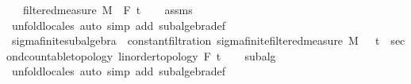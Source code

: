 \begin{isabellebody}
\ \ \ {\isachardoublequoteopen}filtered{\isacharunderscore}{\kern0pt}measure\ M\ {\isacharparenleft}{\kern0pt}{\isasymlambda}{\isacharunderscore}{\kern0pt}{\isachardot}{\kern0pt}\ F{\isacharparenright}{\kern0pt}\ t\isanewline
%
\isadelimproof
\ \ %
\endisadelimproof
%
\isatagproof
{}\isamarkupfalse%
\ assms\ \isamarkupfalse%
\ {\isacharparenleft}{\kern0pt}unfold{\isacharunderscore}{\kern0pt}locales{\isacharparenright}{\kern0pt}\ {\isacharparenleft}{\kern0pt}auto\ simp\ add{\isacharcolon}{\kern0pt}\ subalgebra{\isacharunderscore}{\kern0pt}def{\isacharparenright}{\kern0pt}%
\endisatagproof
{\isafoldproof}%
%
\isadelimproof
\isanewline
%
\endisadelimproof
\isanewline
{}\isamarkupfalse%
\ sigma{\isacharunderscore}{\kern0pt}finite{\isacharunderscore}{\kern0pt}subalgebra\ {\isasymsubseteq}\ constant{\isacharunderscore}{\kern0pt}filtration{\isacharcolon}{\kern0pt}\ sigma{\isacharunderscore}{\kern0pt}finite{\isacharunderscore}{\kern0pt}filtered{\isacharunderscore}{\kern0pt}measure\ M\ {\isachardoublequoteopen}{\isasymlambda}{\isacharunderscore}{\kern0pt}\ {\isacharcolon}{\kern0pt}{\isacharcolon}{\kern0pt}\ {\isacharprime}{\kern0pt}t\ {\isacharcolon}{\kern0pt}{\isacharcolon}{\kern0pt}\ {\isacharbraceleft}{\kern0pt}second{\isacharunderscore}{\kern0pt}countable{\isacharunderscore}{\kern0pt}topology{\isacharcomma}{\kern0pt}\ linorder{\isacharunderscore}{\kern0pt}topology{\isacharbraceright}{\kern0pt}{\isachardot}{\kern0pt}\ F{\isachardoublequoteclose}\ t\isanewline
%
\isadelimproof
\ \ %
\endisadelimproof
%
\isatagproof
{}\isamarkupfalse%
\ subalg\ \isamarkupfalse%
\ {\isacharparenleft}{\kern0pt}unfold{\isacharunderscore}{\kern0pt}locales{\isacharparenright}{\kern0pt}\ {\isacharparenleft}{\kern0pt}auto\ simp\ add{\isacharcolon}{\kern0pt}\ subalgebra{\isacharunderscore}{\kern0pt}def{\isacharparenright}{\kern0pt}%
\endisatagproof
{\isafoldproof}%
%
\isadelimproof
\isanewline
%
\endisadelimproof
%
\isadelimtheory
\isanewline
%
\endisadelimtheory
%
\isatagtheory
{}\isamarkupfalse%
%
\endisatagtheory
{\isafoldtheory}%
%
\isadelimtheory
%
\endisadelimtheory
%
\end{isabellebody}%
\endinput
